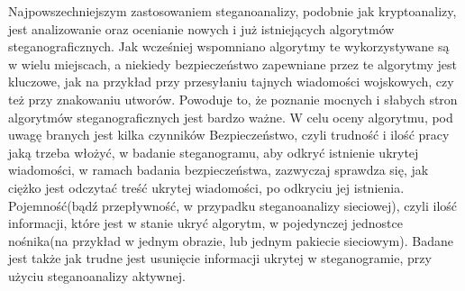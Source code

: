 \documentclass[a4paper, twoside]{report}
\begin{document}
        Najpowszechniejszym zastosowaniem steganoanalizy, podobnie jak kryptoanalizy,
        jest analizowanie oraz ocenianie nowych i już istniejących algorytmów steganograficznych.
        Jak wcześniej wspomniano algorytmy te wykorzystywane są w wielu miejscach,
        a niekiedy bezpieczeństwo zapewniane przez te algorytmy jest kluczowe, jak
        na przykład przy przesyłaniu tajnych wiadomości wojskowych, czy też przy znakowaniu
        utworów. Powoduje to, że poznanie mocnych i słabych stron algorytmów steganograficznych
        jest bardzo ważne. W celu oceny algorytmu, pod uwagę branych jest kilka czynników
        Bezpieczeństwo, czyli trudność i ilość pracy jaką trzeba włożyć,
        w badanie steganogramu, aby odkryć istnienie ukrytej wiadomości,
        w ramach badania bezpieczeństwa, zazwyczaj sprawdza się, jak ciężko
        jest odczytać treść ukrytej wiadomości, po odkryciu jej istnienia.
        Pojemność(bądź przepływność, w przypadku steganoanalizy sieciowej), czyli
        ilość informacji, które jest w stanie ukryć algorytm, w pojedynczej jednostce
        nośnika(na przykład w jednym obrazie, lub jednym pakiecie sieciowym). Badane
        jest także jak trudne jest usunięcie informacji ukrytej w steganogramie, przy
        użyciu steganoanalizy aktywnej.
\end{document}
